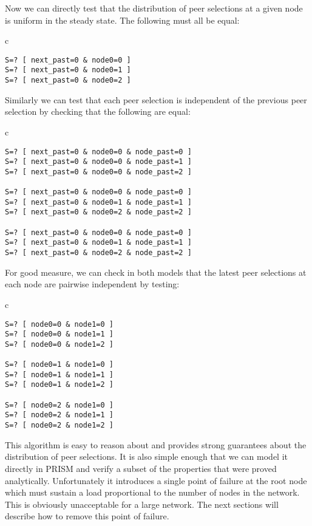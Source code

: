\documentclass[a4paper,10pt]{article}
\newenvironment{prismprop}[0]{
  \begin{center}
  \begin{tabular}{c}
  \footnotesize
}{
  \end{tabular}
  \end{center}
}
\begin{document}
Now we can directly test that the distribution of peer selections at a given node is uniform in the steady state. The following must all be equal:

\begin{prismprop}
\begin{lstlisting}
S=? [ next_past=0 & node0=0 ]
S=? [ next_past=0 & node0=1 ]
S=? [ next_past=0 & node0=2 ]
\end{lstlisting}
\end{prismprop}

Similarly we can test that each peer selection is independent of the previous peer selection by checking that the following are equal:

\begin{prismprop}
\begin{lstlisting}
S=? [ next_past=0 & node0=0 & node_past=0 ]
S=? [ next_past=0 & node0=0 & node_past=1 ]
S=? [ next_past=0 & node0=0 & node_past=2 ]

S=? [ next_past=0 & node0=0 & node_past=0 ]
S=? [ next_past=0 & node0=1 & node_past=1 ]
S=? [ next_past=0 & node0=2 & node_past=2 ]

S=? [ next_past=0 & node0=0 & node_past=0 ]
S=? [ next_past=0 & node0=1 & node_past=1 ]
S=? [ next_past=0 & node0=2 & node_past=2 ]
\end{lstlisting}
\end{prismprop}

For good measure, we can check in both models that the latest peer selections at each node are pairwise independent by testing:

\begin{prismprop}
\begin{lstlisting}
S=? [ node0=0 & node1=0 ]
S=? [ node0=0 & node1=1 ]
S=? [ node0=0 & node1=2 ]

S=? [ node0=1 & node1=0 ]
S=? [ node0=1 & node1=1 ]
S=? [ node0=1 & node1=2 ]

S=? [ node0=2 & node1=0 ]
S=? [ node0=2 & node1=1 ]
S=? [ node0=2 & node1=2 ]
\end{lstlisting}
\end{prismprop}

This algorithm is easy to reason about and provides strong guarantees about the distribution of peer selections. It is also simple enough that we can model it directly in PRISM and verify a subset of the properties that were proved analytically. Unfortunately it introduces a single point of failure at the root node which must sustain a load proportional to the number of nodes in the network. This is obviously unacceptable for a large network. The next sections will describe how to remove this point of failure.
\end{document}

